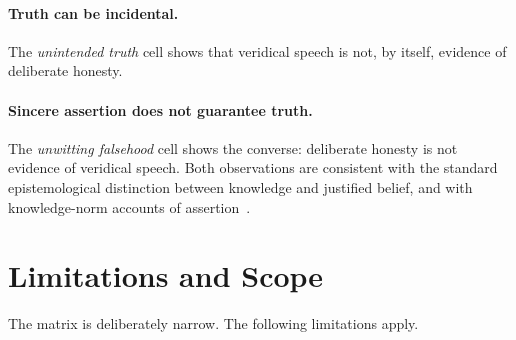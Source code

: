 \documentclass[11pt,a4paper]{article}
\begin{document}
\paragraph{Truth can be incidental.} The \emph{unintended truth} cell
shows that veridical speech is not, by itself, evidence of deliberate
honesty.

\paragraph{Sincere assertion does not guarantee truth.} The
\emph{unwitting falsehood} cell shows the converse: deliberate honesty
is not evidence of veridical speech. Both observations are consistent
with the standard epistemological distinction between knowledge and
justified belief, and with knowledge-norm accounts of
assertion~\cite{williamson2000}.

\section{Limitations and Scope}
\label{sec:limits}

The matrix is deliberately narrow. The following limitations apply.
\end{document}
